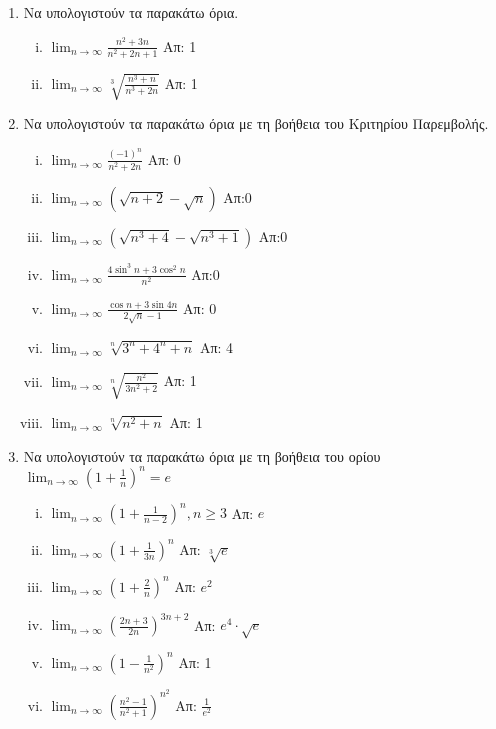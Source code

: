 \documentclass[a4paper,table]{report}
\begin{document}
\begin{enumerate}

  \item Να υπολογιστούν τα παρακάτω όρια.
    \begin{enumerate}[i)]
      \item $ \lim_{n \to \infty} \frac{n^{2}+3n}{n^{2}+2n+1} $ \hfill Απ: 1 
      \item $ \lim_{n \to \infty} \sqrt[3]{\frac{n^{3}+n}{n^{3}+2n}} $ 
        \hfill Απ: 1 
    \end{enumerate}

  \item Να υπολογιστούν τα παρακάτω όρια με τη βοήθεια του Κριτηρίου 
    Παρεμβολής.

    \begin{enumerate}[i)]
      \item $ \lim_{n \to \infty} \frac{(-1)^{n}}{n^{2}+2n}  $ \hfill Απ: 0  
      \item $ \lim_{n \to \infty} (\sqrt{n+2} - \sqrt{n})  $ \hfill Απ:0
      \item $ \lim_{n \to \infty} (\sqrt{n^{3}+4} - \sqrt{n^{3}+1})  $ \hfill Απ:0
      \item $ \lim_{n \to \infty} \frac{4 \sin^{3}{n} + 3 \cos^{2}{n}}{n^{2}} $ 
        \hfill Απ:0
      \item $ \lim_{n \to \infty} \frac{\cos{n} + 3 \sin{4n}}{ 2
        \sqrt{n} -1} $ \hfill Απ: 0  
      \item $ \lim_{n \to \infty} \sqrt[n]{3^{n}+4^{n}+n} $ \hfill Απ: 4 
      \item $ \lim_{n \to \infty} \sqrt[n]{\frac{n^{2}}{3n^{2}+2}} $ \hfill Απ: 1 
      \item $ \lim_{n \to \infty} \sqrt[n]{n^{2}+n} $ \hfill Απ: 1 
    \end{enumerate}

  \item Να υπολογιστούν τα παρακάτω όρια με τη βοήθεια του ορίου 
    $ \lim_{n \to \infty} \left(1+ \frac{1}{n}\right)^{n}=e $

    \begin{enumerate}[i)]
      \item $ \lim_{n \to \infty} \left(1+ \frac{1}{n-2}\right)^{n}, 
        n \geq 3 $ 
        \hfill Απ: $e$  
      \item $ \lim_{n \to \infty} \left(1 + \frac{1}{3n}\right)^{n} $ 
        \hfill Απ: $ \sqrt[3]{e} $ 
      \item $ \lim_{n \to \infty} \left(1+ \frac{2}{n}\right)^{n} $ 
        \hfill Απ: $ e^{2} $ 
      \item $ \lim_{n \to \infty} \left(\frac{2n +3}{2n} \right)^{3n+2}  $
        \hfill Απ: $ e^{4}\cdot \sqrt{e} $ 
      \item $ \lim_{n \to \infty}\left(1-\frac{1}{n^{2}} \right)^{n} $ 
        \hfill Απ: 1 
      \item $ \lim_{n \to \infty} \left(\frac{n^{2}-1}{n^{2}+1} \right)^{n^{2}} $
        \hfill Απ: $ \frac{1}{e^{2}} $ 
    \end{enumerate}
\end{enumerate}
\end{document}
